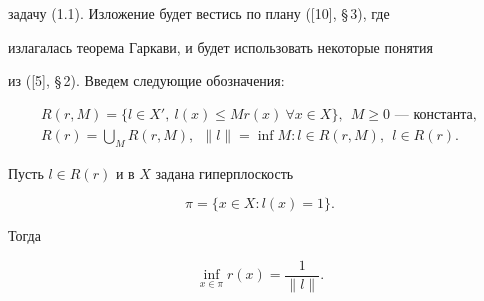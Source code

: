 задачу (1.1). Изложение будет вестись по плану ([10], \S\,3), где 


излагалась теорема Гаркави, и будет использовать некоторые понятия 


из ([5], \S\,2). Введем следующие обозначения: 


\begin{equation} 


\begin{array}{c} 


R(r,M)=\{l\in X',\ l(x)\le M r(x)\ \forall x\in X\}, 


\ \ M\ge0 \text{ --- константа}, \\ [2mm]


R(r)=\bigcup\limits_M R(r,M), 


\ \ \|l\|=\inf M:l\in R(r,M), \ \ l\in R(r). 


\end{array} 


\end{equation} 


 


\begin{lems} 


Пусть $l\in R(r)$ и в $X$ задана гиперплоскость 


\begin{equation} 


\pi=\{x\in X:l(x)=1\}. 


\end{equation} 


Тогда 


\begin{equation} 


\inf_{x\in\pi}r(x)=\frac{1}{\|l\|}. 


\end{equation} 


\end{lems} 


 


